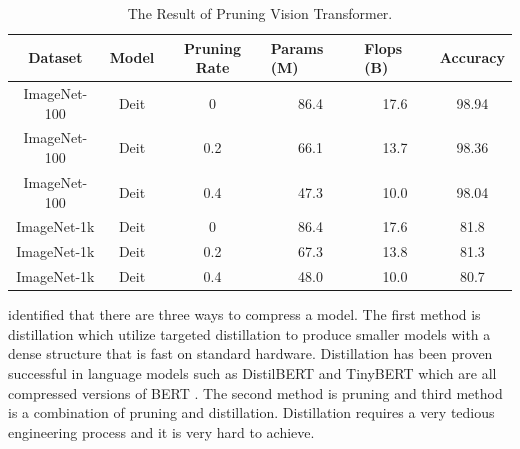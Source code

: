 \FloatBarrier
\begin{table}[]
\begin{tabular}{|c|c|c|c|c|c|}
\hline
\textbf{Dataset} & \textbf{Model} & \textbf{Pruning Rate} & \multicolumn{1}{l|}{\textbf{Params (M)}} & \multicolumn{1}{l|}{\textbf{Flops (B)}} & \multicolumn{1}{l|}{\textbf{Accuracy}} \\ \hline
ImageNet-100     & Deit           & 0                     & 86.4                                     & 17.6                                    & 98.94                                  \\ \hline
ImageNet-100     & Deit           & 0.2                   & 66.1                                     & 13.7                                    & 98.36                                  \\ \hline
ImageNet-100     & Deit           & 0.4                   & 47.3                                     & 10.0                                    & 98.04                                  \\ \hline
ImageNet-1k      & Deit           & 0                     & 86.4                                     & 17.6                                    & 81.8                                   \\ \hline
ImageNet-1k      & Deit           & 0.2                   & 67.3                                     & 13.8                                    & 81.3                                   \\ \hline
ImageNet-1k      & Deit           & 0.4                   & 48.0                                     & 10.0                                    & 80.7                                   \\ \hline
\end{tabular}
\caption{The Result of Pruning Vision Transformer.}
\label{tab:pruning}
\end{table}
\FloatBarrier

 identified that there are three ways to compress a model. The first method is distillation which utilize targeted distillation to produce smaller models with a dense structure that is fast on standard hardware. Distillation has been proven successful in language models such as DistilBERT \cite{distilbert} and TinyBERT \cite{tinybert} which are all compressed versions of BERT \cite{bert}. The second method is pruning and third method is a combination of pruning and distillation. Distillation requires a very tedious engineering process and it is very hard to achieve.

